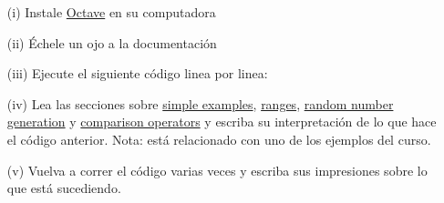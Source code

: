 \begin{problema}
	\begin{enumerate}
		\item[(i)] 
			Instale \href{www.octave.org}{Octave} en su computadora
		\item[(ii)] 
			\'Echele un ojo a la documentaci\'on
		\item[(iii)] 
			Ejecute el siguiente c\'odigo linea por linea: 
		\item[(iv)] 
			Lea las secciones sobre 
			\href{http://www.gnu.org/software/octave/doc/interpreter/Simple-Examples.html#Simple-Examples}{simple examples}, 
			\href{http://www.gnu.org/software/octave/doc/interpreter/Ranges.html#Ranges}{ranges}, 
			\href{http://www.gnu.org/software/octave/doc/interpreter/Random-Number-Generation.html#Random-Number-Generation}{random number generation} 
			y 
			\href{http://www.gnu.org/software/octave/doc/interpreter/Comparison-Ops.html#Comparison-Ops}{comparison operators} 
			y escriba su interpretaci\'on de lo que hace el c\'odigo anterior. Nota: est\'a relacionado con uno de los ejemplos del curso.
		\item[(v)] 
			Vuelva a correr el c\'odigo varias veces y escriba sus impresiones sobre lo que est\'a sucediendo.
	\end{enumerate}
\end{problema}

\\